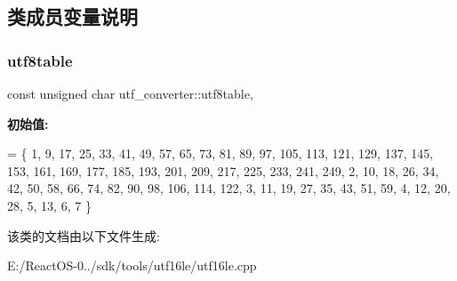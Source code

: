 \subsection{类成员变量说明}
\mbox{\label{classutf__converter_a2344354f8e9923372bd845c30faa10f0}} 
\subsubsection{\texorpdfstring{utf8table}{utf8table}}
{\footnotesize\ttfamily const unsigned char utf\+\_\+converter\+::utf8table\hspace{0.3cm}{\ttfamily [static]}, {\ttfamily [protected]}}

{\bfseries 初始值\+:}
\begin{DoxyCode}
= \{
1, 9, 17, 25, 33, 41, 49, 57, 65, 73, 81, 89, 97, 105, 113, 121,
129, 137, 145, 153, 161, 169, 177, 185, 193, 201, 209, 217, 225, 233, 241, 249,
2, 10, 18, 26, 34, 42, 50, 58, 66, 74, 82, 90, 98, 106, 114, 122,
3, 11, 19, 27, 35, 43, 51, 59, 4, 12, 20, 28, 5, 13, 6, 7
\}
\end{DoxyCode}


该类的文档由以下文件生成\+:\begin{DoxyCompactItemize}
\item 
E\+:/\+React\+O\+S-\/0../sdk/tools/utf16le/utf16le.\+cpp\end{DoxyCompactItemize}
